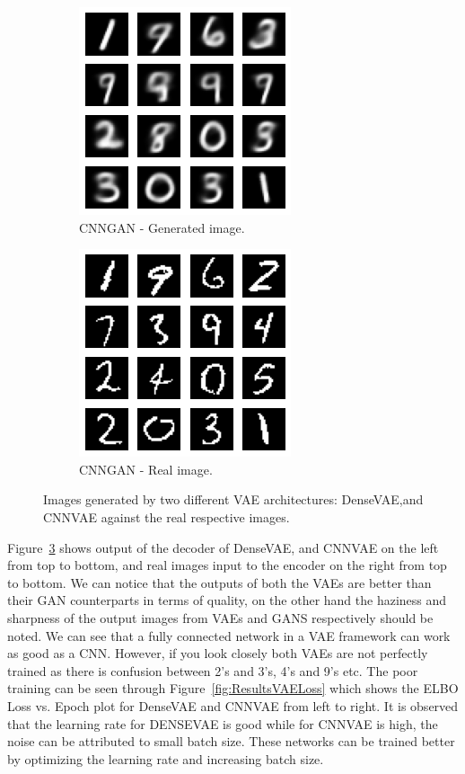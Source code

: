 \documentclass{article}
\begin{document}
\begin{figure}[htbp]
		\begin{subfigure}[t]{0.48\textwidth}
			\centering
			\includegraphics[scale=0.45]{VAE_CNN_GenImage.png}
			\caption{CNNGAN - Generated image.}
			\label{fig:VAEImage_2}
		\end{subfigure}
		\begin{subfigure}[t]{0.48\textwidth}
		\centering
		\includegraphics[scale=0.45]{VAE_CNN_RealImage.png}
		\caption{CNNGAN - Real image.}
		\label{fig:VAERealImage_2}
		\end{subfigure}
		\caption{ Images generated by two different VAE architectures: DenseVAE,and CNNVAE against the real respective images.}
		\label{fig:ResultsVAEImages}
	\end{figure}

	Figure~\ref{fig:ResultsVAEImages} shows output of the decoder of  DenseVAE, and CNNVAE on the left from top to bottom, and real images input to the encoder on the right from top to bottom. We can notice that the outputs of both the VAEs are better than their GAN counterparts in terms of quality, on the other hand the haziness and sharpness of the output images from VAEs and GANS respectively should be noted. We can see that a fully connected network in a VAE framework can work as good as a CNN. However, if you look closely both VAEs are not perfectly trained as there is confusion between 2's and 3's, 4's and 9's etc. The poor training can be seen through Figure~\ref{fig:ResultsVAELoss} which shows the ELBO Loss vs. Epoch plot for DenseVAE and CNNVAE from left to right. It is observed that the learning rate for DENSEVAE is good while for CNNVAE is high, the noise can be attributed to small batch size. These networks can be trained better by optimizing the learning rate and increasing batch size. 
	
\end{document}
